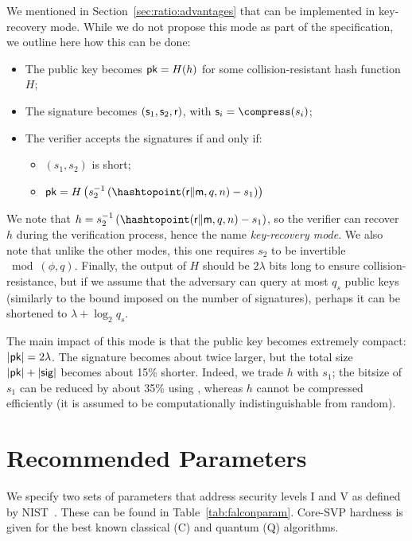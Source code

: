 We mentioned in Section~\ref{sec:ratio:advantages} that \falcon can be implemented in key-recovery mode. While we do not propose this mode as part of the specification, we outline here how this can be done:
\begin{itemize}
	\item The public key becomes $\textsf{pk} = H(h)$ for some collision-resistant hash function $H$;
	\item The signature becomes $(\textsf{s}_1, \textsf{s}_2, \textsf{r})$, with $\comps_i = \compress(s_i)$;
	\item The verifier accepts the signatures if and only if:
	\begin{itemize}[noitemsep]
		\item $(s_1, s_2)$ is short;
		\item $ \pk = H \left(s_2^{-1} \left( \hashtopoint(\salt\|\msg, q, n) - s_1 \right) \right)$
	\end{itemize}
\end{itemize}
We note that $h = s_2^{-1} \left( \hashtopoint(\salt\|\msg, q, n) - s_1 \right)$, so the verifier can recover $h$ during the verification process, hence the name \textit{key-recovery mode}.
We also note that unlike the other modes, this one requires $s_2$ to be invertible $\bmod (\phi, q)$. Finally, the output of $H$ should be $2 \lambda$ bits long to ensure collision-resistance, but if we assume that the adversary can query at most $q_s$ public keys (similarly to the bound imposed on the number of signatures), perhaps it can be shortened to $\lambda + \log_2 q_s$.

The main impact of this mode is that the public key becomes extremely compact: $|\textsf{pk}| = 2 \lambda$. The signature becomes about twice larger, but the total size $|\textsf{pk}| + |\textsf{sig}|$ becomes about 15\% shorter. Indeed, we trade $h$ with $s_1$; the bitsize of $s_1$ can be reduced by about 35\% using \compress, whereas $h$ cannot be compressed efficiently (it is assumed to be computationally indistinguishable from random).


\section{Recommended Parameters} \label{sec:spec:params}

We specify two sets of parameters that address security levels I and V as defined by NIST~\cite[Section 4.A.5]{NIST}. These can be found in Table~\ref{tab:falconparam}. Core-SVP hardness is given for the best known classical (C) and quantum (Q) algorithms.

